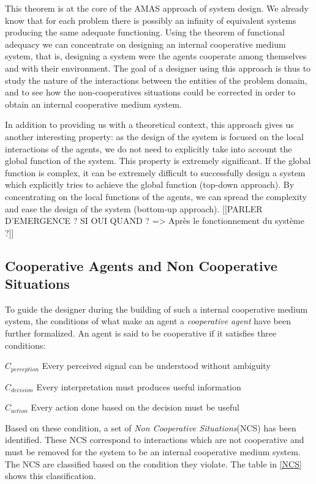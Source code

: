This theorem is at the core of the AMAS approach of system design. We already know that for each problem there is possibly an infinity of equivalent systems producing the same adequate functioning. Using the theorem of functional adequacy we can concentrate on designing an internal cooperative medium system, that is, designing a system were the agents cooperate among themselves and with their environment. The goal of a designer using this approach is thus to study the nature of the interactions between the entities of the problem domain, and to see how the non-cooperatives situations could be corrected in order to obtain an internal cooperative medium system.

In addition to providing us with a theoretical context, this approach gives us another interesting property: as the design of the system is focused on the local interactions of the agents, we do not need to explicitly take into account the global function of the system. This property is extremely significant. If the global function is complex, it can be extremely difficult to successfully design a system which explicitly tries to achieve the global function (top-down approach). By concentrating on the local functions of the agents, we can spread the complexity and ease the design of the system (bottom-up approach). [[PARLER D'EMERGENCE ? SI OUI QUAND ? => Après le fonctionnement du système ?]]

\subsection{Cooperative Agents and Non Cooperative Situations}

To guide the designer during the building of such a internal cooperative medium system, the conditions of what make an agent a \emph{cooperative agent} have been further formalized. An agent is said to be cooperative if it satisfies three conditions:
\begin{compactitem}
\item $C_{perception}$ Every perceived signal can be understood without ambiguity
\item $C_{decision}$ Every interpretation must produces useful information
\item $C_{action}$ Every action done based on the decision must be useful
\end{compactitem}

Based on these condition, a set of \emph{Non Cooperative Situations}(NCS) has been identified. These NCS correspond to interactions which are not cooperative and must be removed for the system to be an internal cooperative medium system. The NCS are classified based on the condition they violate. The table in \figurename{} \ref{NCS} shows this classification.

